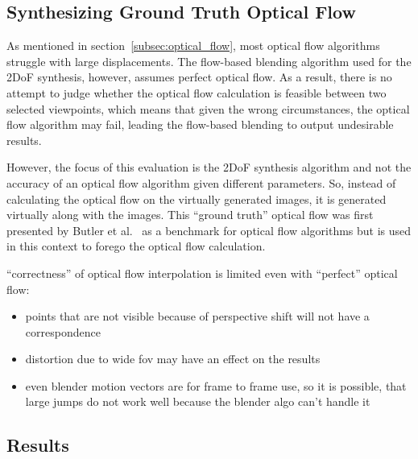\subsection{Synthesizing Ground Truth Optical Flow}
As mentioned in section~\ref{subsec:optical_flow}, most optical flow algorithms struggle with large displacements. The flow-based blending algorithm used for the 2DoF synthesis, however, assumes perfect optical flow. As a result, there is no attempt to judge whether the optical flow calculation is feasible between two selected viewpoints, which means that given the wrong circumstances, the optical flow algorithm may fail, leading the flow-based blending to output undesirable results.

However, the focus of this evaluation is the 2DoF synthesis algorithm and not the accuracy of an optical flow algorithm given different parameters. So, instead of calculating the optical flow on the virtually generated images, it is generated virtually along with the images. This ``ground truth'' optical flow was first presented by Butler et al.\ \cite{sintel} as a benchmark for optical flow algorithms but is used in this context to forego the optical flow calculation.


``correctness'' of optical flow interpolation is limited even with ``perfect'' optical flow:
\begin{itemize}
   \item points that are not visible because of perspective shift will not have a correspondence
   \item distortion due to wide fov may have an effect on the results
   \item even blender motion vectors are for frame to frame use, so it is possible, that large jumps do not work well because the blender algo can't handle it
\end{itemize}

\subsection{Results}
